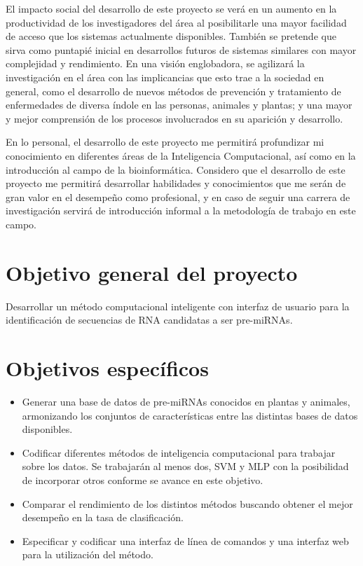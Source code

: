 \documentclass[12pt,bibliography=oldstyle,DIV=12,parskip=full-]{scrartcl}
\begin{document}
%
El impacto social del desarrollo de este proyecto se verá en un
aumento en la productividad de los investigadores del área al
posibilitarle una mayor facilidad de acceso que los sistemas actualmente
disponibles. También se pretende que sirva como puntapié inicial en
desarrollos futuros de sistemas similares con mayor complejidad y
rendimiento. En una visión englobadora, se agilizará la investigación
en el área con las implicancias que esto trae a la sociedad en
general, como el desarrollo de nuevos métodos de prevención y
tratamiento de enfermedades de diversa índole en las personas,
animales y plantas; y una mayor y mejor comprensión de los procesos
involucrados en su aparición y desarrollo.

En lo personal, el desarrollo de este proyecto me permitirá
profundizar mi conocimiento en diferentes áreas de la Inteligencia
Computacional, así como en la introducción al campo de la
bioinformática. Considero que el desarrollo de este proyecto me
permitirá desarrollar habilidades y conocimientos que me serán de gran
valor en el desempeño como profesional, y en caso de seguir una
carrera de investigación servirá de introducción informal a la
metodología de trabajo en este campo.
%
%
\section{Objetivo general del proyecto}
Desarrollar un método computacional inteligente con interfaz de
usuario para la identificación de secuencias de RNA candidatas a ser
pre-miRNAs.
\section{Objetivos específicos}
\begin{itemize}
\item Generar una base de datos de pre-miRNAs conocidos en plantas y
  animales, armonizando los conjuntos de características entre las
  distintas bases de datos disponibles.
\item Codificar diferentes métodos de inteligencia computacional para
  trabajar sobre los datos. Se trabajarán al menos dos, SVM y MLP con
  la posibilidad de incorporar otros conforme se avance en este
  objetivo.
\item Comparar el rendimiento de los distintos métodos buscando
  obtener el mejor desempeño en la tasa de clasificación.
\item Especificar y codificar una interfaz de línea de comandos y una
  interfaz web para la utilización del método.
\end{itemize}
%
%
\end{document}

